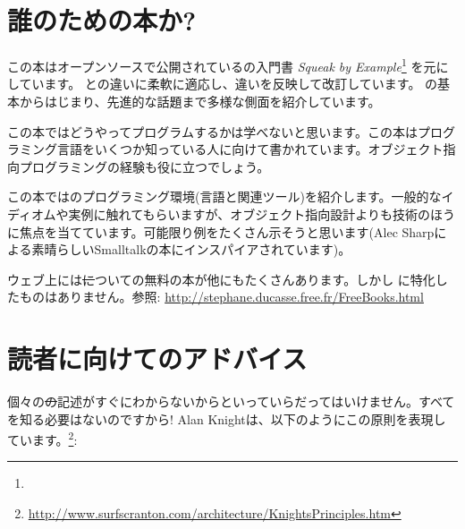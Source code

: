 \documentclass[a4paper,10pt,twoside]{book}
\begin{document}
\section*{誰のための本か?}

この本はオープンソースで公開されている\squeak の入門書 \emph{Squeak by Example}\footnote{\sbe} を元にしています。
\pharo と\squeak の違いに柔軟に適応し、違いを反映して改訂しています。
\pharo の基本からはじまり、先進的な話題まで多様な側面を紹介しています。

この本ではどうやってプログラムするかは学べないと思います。この本はプログラミング言語をいくつか知っている人に向けて書かれています。オブジェクト指向プログラミングの経験も役に立つでしょう。

この本では\pharo のプログラミング環境(言語と関連ツール)を紹介します。一般的なイディオムや実例に触れてもらいますが、オブジェクト指向設計よりも技術のほうに焦点を当てています。可能限り例をたくさん示そうと思います(Alec Sharpによる素晴らしいSmalltalkの本\cite{Shar97a}にインスパイアされています)。

ウェブ上には\st についての無料の本が他にもたくさんあります。しかし \pharo に特化したものはありません。参照:
\url{http://stephane.ducasse.free.fr/FreeBooks.html}

\ifluluelse{}{\newpage} %
\section*{読者に向けてのアドバイス}


個々の\st の記述がすぐにわからないからといっていらだってはいけません。すべてを知る必要はないのですから!
Alan Knightは、以下のようにこの原則を表現しています。\footnote{\url{http://www.surfscranton.com/architecture/KnightsPrinciples.htm}}:

\end{document}
